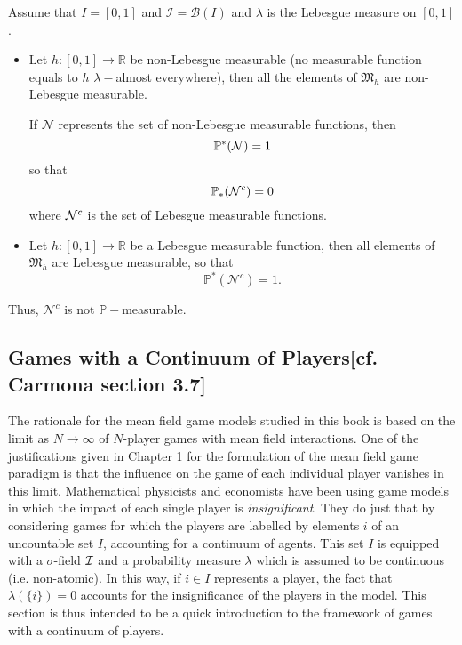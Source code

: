 	
\begin{remark}
	Assume that $I=[0,1]$ and $\mathcal{I}=\mathcal{B}(I)$ and $\lambda$ is the Lebesgue measure on $[0,1]$.
	\begin{itemize}
		\item Let $h:[0,1] \to \mathbb{R}$ be non-Lebesgue measurable (no measurable function equals to $h$ $\lambda-$almost everywhere), then all the elements of $\mathfrak{M}_h$ are non-Lebesgue measurable. 
		
		If $\mathcal{N}$ represents the set of non-Lebesgue measurable functions, then
		$$
			\mathbb{P}^*({\cal N}) = 1
		$$
		so that 
		$$
			\mathbb{P}_*({\cal N}^c) = 0
		$$
		where ${\cal N}^c$ is the set of Lebesgue measurable functions.
		\item Let $h:[0,1] \to \mathbb{R}$ be a Lebesgue measurable function, then all elements of $\mathfrak{M}_h$ are Lebesgue measurable, so that
		$$
			\mathbb{P}^*(\mathcal{N}^c) = 1.
		$$
	\end{itemize}
	Thus, $\mathcal{N}^c$ is not $\mathbb{P}-$measurable.
\end{remark}


\subsection[Games with a Continuum of Players]{\textbf{Games with a Continuum of Players}[cf. Carmona section 3.7]}
\label{se:continuum}

The rationale for the mean field game models studied in this book is based on the limit as $N\to\infty$ of $N$-player games with mean field interactions. One of the justifications given in Chapter 1 for the formulation of the mean field game paradigm is that the influence on the game of each individual player vanishes in this limit. Mathematical physicists and economists have been using game models in which the impact of each single player is \emph{insignificant}. They do just that by considering games for which the players are labelled by elements $i$ of an uncountable set $I$, accounting for a continuum of agents. This set $I$ is equipped with a $\sigma$-field ${\cal I}$ and a probability measure $\lambda$ which is assumed to be continuous (i.e. non-atomic). In this way, if $i\in I$ represents a player, the fact that $\lambda(\{i\})=0$ accounts for the insignificance of the players in the model. This section is thus intended to be a quick introduction to the framework of games with a continuum of players.

